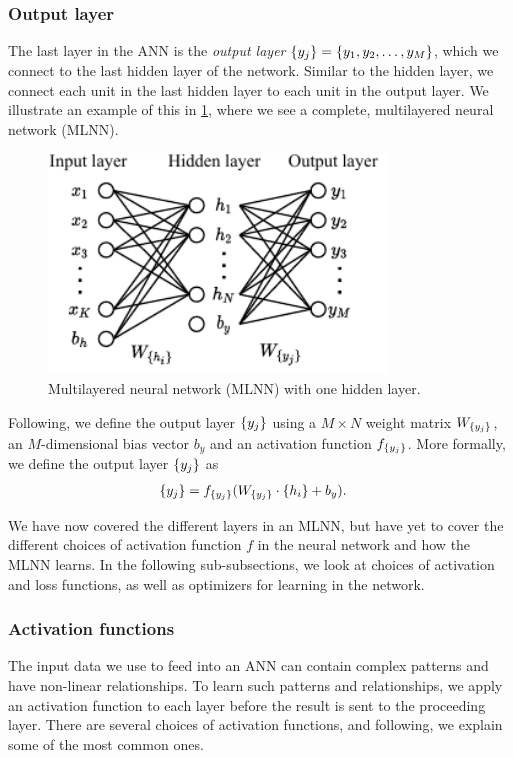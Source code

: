\subsubsection{Output layer}
\label{sec:ann-output-layer}
The last layer in the ANN is the \textit{output layer} $\left\{ {y}_{j} \right\} = \left\{ y_1, y_2, \ldots, y_M \right\}$, which we connect to the last hidden layer of the network. Similar to the hidden layer, we connect each unit in the  last hidden layer to each unit in the output layer. We illustrate an example of this in \cref{fig:mlnn-one-hidden}, where we see a complete, multilayered neural network (MLNN).
\begin{figure}[H]
    \centering
    \includegraphics[width=9cm]{thesis/figures/artificial-neural-network_cropped.pdf}
    \caption{Multilayered neural network (MLNN) with one hidden layer.}
    \label{fig:mlnn-one-hidden}
\end{figure}

Following, we define the output layer $\left\{ {y}_{j} \right\}$ using a $M \times N$ weight matrix $W_{\left\{ {y}_{j} \right\}}$, an $M$-dimensional bias vector $b_y$ and an activation function $f_{\left\{ {y}_{j} \right\}}$. More formally, we define the output layer $\left\{ {y}_{j} \right\}$ as
\begin{align}
    \label{eqn:output-layer-ann}
    \left\{ {y}_{j} \right\} &= f_{\left\{ {y}_{j} \right\}}(W_{\left\{ {y}_{j} \right\}} \cdot \left\{ {h}_{i} \right\} + b_y).
\end{align}

We have now covered the different layers in an MLNN, but have yet to cover the different choices of activation function $f$ in the neural network and how the MLNN learns. In the following sub-subsections, we look at choices of activation and loss functions, as well as optimizers for learning in the network.

\subsubsection{Activation functions}
\label{sec:ann-activation-functions}
The input data we use to feed into an ANN can contain complex patterns and have non-linear relationships. To learn such patterns and relationships, we apply an activation function to each layer before the result is sent to the proceeding layer. There are several choices of activation functions, and following, we explain some of the most common ones.

